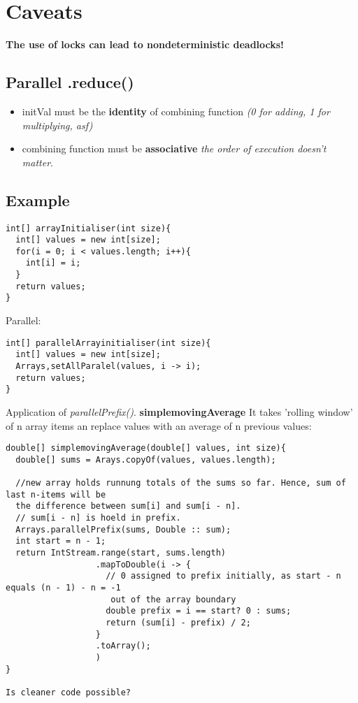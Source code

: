 \documentclass{report}
\begin{document}
\section{Caveats}
\textbf{The use of locks can lead to nondeterministic deadlocks!}

\subsection{Parallel .reduce()}
\begin{itemize}
	\item initVal must be the \textbf{identity} of combining function \textit{(0 for adding, 1 for multiplying, asf)}
	\item combining function must be \textbf{associative} \textit{the order of execution doesn't matter}.
\end{itemize}

\subsection*{Example}
\begin{verbatim}
int[] arrayInitialiser(int size){
  int[] values = new int[size];
  for(i = 0; i < values.length; i++){
    int[i] = i;
  }
  return values;
}
\end{verbatim}
Parallel:
\begin{verbatim}
int[] parallelArrayinitialiser(int size){
  int[] values = new int[size];
  Arrays,setAllParalel(values, i -> i);
  return values;
}
\end{verbatim}

Application of \textit{parallelPrefix()}. \textbf{simplemovingAverage} 
It takes 'rolling window' of n array items an replace values with an average
of n previous values:
\begin{verbatim}
double[] simplemovingAverage(double[] values, int size){
  double[] sums = Arays.copyOf(values, values.length);
  
  //new array holds runnung totals of the sums so far. Hence, sum of last n-items will be 
  the difference between sum[i] and sum[i - n].
  // sum[i - n] is hoeld in prefix. 
  Arrays.parallelPrefix(sums, Double :: sum);
  int start = n - 1;
  return IntStream.range(start, sums.length)
                  .mapToDouble(i -> {
                    // 0 assigned to prefix initially, as start - n equals (n - 1) - n = -1
                     out of the array boundary
                    double prefix = i == start? 0 : sums;
                    return (sum[i] - prefix) / 2;
                  }
                  .toArray();
                  )
}

Is cleaner code possible?
\end{verbatim}
\end{document}

